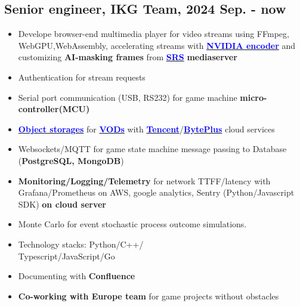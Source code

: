 \begin{experiencebox}\label{experience}
\subsection*{Senior engineer, IKG Team, 2024 Sep. - now}
\begin{itemize}[noitemsep]
    \item Develope browser-end multimedia player for video streams using FFmpeg, WebGPU,WebAssembly, 
    accelerating streams with \href{https://developer.nvidia.com/video-codec-sdk}{\textbf{\textcolor{blue}{NVIDIA encoder}}} 
    and customizing\textbf{ AI-masking frames} from \href{https://github.com/ossrs/srs}{\textbf{\textcolor{blue}{SRS}}} \textbf{ mediaserver} 
    \item Authentication for stream requests
    \item Serial port communication (USB, RS232) for game machine \textbf{micro-controller(MCU)}
    \item \href{https://www.byteplus.com/en/product/tos}{\textbf{\textcolor{blue}{Object storages}}} for \href{https://www.overleaf.com/read/xzdtxtgxtnby#49163b}{\textbf{\textcolor{blue}{VODs}}} with \href{https://www.tencent.com/en-us/cloud}{\textbf{\textcolor{blue}{Tencent}}}/\href{https://www.byteplus.com/en/product/vod}{\textbf{\textcolor{blue}{BytePlus}}} cloud services
    \item Websockets/MQTT for game state machine message passing to Database (\textbf{PostgreSQL, MongoDB})
    \item \textbf{Monitoring/Logging/Telemetry} for network TTFF/latency with Grafana/Prometheus on AWS, 
    google analytics, Sentry (Python/Javascript SDK) \textbf{on cloud server}
    \item Monte Carlo for event stochastic process outcome simulations.
    \item Technology stacks: Python/C++/\\Typescript/JavaScript/Go 
    \item Documenting with \textbf{Confluence}
    \item \textbf{Co-working with Europe team} for game projects without obstacles
\end{itemize}

\vspace{0.3em}


\end{experiencebox}

